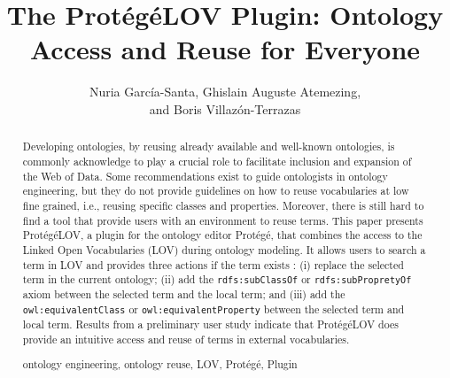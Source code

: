 \documentclass[runningheads,a4paper]{llncs}
\newcommand{\keywords}[1]{\par\addvspace\baselineskip
\noindent\keywordname\enspace\ignorespaces#1}
\begin{document}

\title{The Prot{\'e}g{\'e}LOV Plugin: Ontology Access and Reuse for Everyone }


\author{ Nuria Garc\'ia-Santa, Ghislain Auguste Atemezing,\\ and Boris Villaz{\'o}n-Terrazas}


\maketitle


\begin{abstract}
Developing ontologies, by reusing already available and well-known ontologies, is commonly acknowledge to play a crucial role to facilitate inclusion and expansion of the Web of Data. Some recommendations exist to guide ontologists in ontology engineering, but they do not provide guidelines on how to reuse vocabularies at low fine grained, i.e., reusing specific classes and properties. Moreover, there is still hard to find a tool that provide users with an environment to reuse terms. This paper presents Prot{\'e}g{\'e}LOV, a plugin for the ontology editor Prot{\'e}g{\'e}, that combines the access to the Linked Open Vocabularies (LOV) during ontology modeling. It allows users to search a term in LOV and provides three actions if the term exists : (i) replace the selected term in the current ontology; (ii) add the {\tt rdfs:subClassOf} or {\tt rdfs:subPropretyOf} axiom between the selected term and the local term; and (iii) add the {\tt owl:equivalentClass} or {\tt owl:equivalentProperty} between the selected term and local term. Results from a preliminary user study indicate that Prot{\'e}g{\'e}LOV does provide an intuitive access and reuse of terms in external vocabularies.
\keywords{ontology engineering, ontology reuse, LOV, Prot{\'e}g{\'e}, Plugin} 
\end{abstract}

\end{document}
